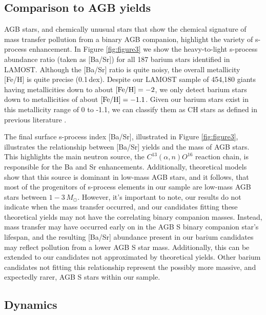 \documentclass[a4paper,fleqn,usenatbib]{mnras}
\begin{document}
\subsection{Comparison to AGB yields}
AGB stars, and chemically unusual stars that show the chemical signature of mass transfer pollution from a binary AGB companion, highlight the variety of s-process enhancement. In Figure \ref{fig:figure3} we show the heavy-to-light s-process abundance ratio (taken as [Ba/Sr]) for all 187 barium stars identified in LAMOST. Although the [Ba/Sr] ratio is quite noisy, the overall metallicity [Fe/H] is quite precise (0.1\,dex). Despite our LAMOST sample of 454,180 giants having metallicities down to about $[{\rm Fe/H}] = -2$, we only detect barium stars down to metallicities of about $[{\rm Fe/H}] = -1.1$. Given our barium stars exist in this metallicity range of 0 to -1.1, we can classify them as CH stars as defined in previous literature \citep[e.g.][]{luck1991, mcclure1997}.

The final surface s-process index [Ba/Sr], illustrated in Figure \ref{fig:figure3}, illustrates the relationship between [Ba/Sr] yields and the mass of AGB stars. This highlights the main neutron source, the $C^{13}(\alpha,n)O^{16}$ reaction chain, is responsible for the Ba and Sr enhancements. Additionally, theoretical models show that this source is dominant in low-mass AGB stars, and it follows, that most of the progenitors of s-process elements in our sample are low-mass AGB stars between $1 - 3\,M_{\odot}$. However, it's important to note, our results do not indicate when the mass transfer occurred, and our candidates fitting these theoretical yields may not have the correlating binary companion masses. Instead, mass transfer may have occurred early on in the AGB S binary companion star's lifespan, and the resulting [Ba/Sr] abundance present in our barium candidates may reflect pollution from a lower AGB S star mass. Additionally, this can be extended to our candidates not approximated by theoretical yields. Other barium candidates not fitting this relationship represent the possibly more massive, and expectedly rarer, AGB S stars within our sample.


\subsection{Dynamics}
\end{document}
